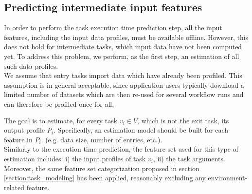 \documentclass[a4paper, 10pt, conference]{ieeeconf}      %
\begin{document}
\subsection{Predicting intermediate input features}
%
\label{section:intermediate_input}
In order to perform the task execution time prediction step, all the input features, including the input data profiles, must be available offline. However, this does not hold for intermediate tasks, which input data have not been computed yet. To address this problem, we perform, as the first step, an estimation of all such data profiles.\\
We assume that entry tasks import data which have already been profiled.
This assumption is in general acceptable, since application users typically download a limited number of datasets which are then re-used for several workflow runs and can therefore be profiled once for all.

 The goal is to estimate, for every task $v_i \in V$, which is not the exit task, its output profile $P_i$.
 Specifically, an estimation model should be built for each feature in $P_i$. (e.g. data size, number of entries, etc.). \\
 Similarly to the execution time prediction, the feature set used for this type of estimation includes: i) the input profiles of task $v_i$, ii) the task arguments.  Moreover, the same feature set  categorization proposed in section \ref{section:task_modeling} has been applied, reasonably excluding any environment-related feature.
 
\end{document}
